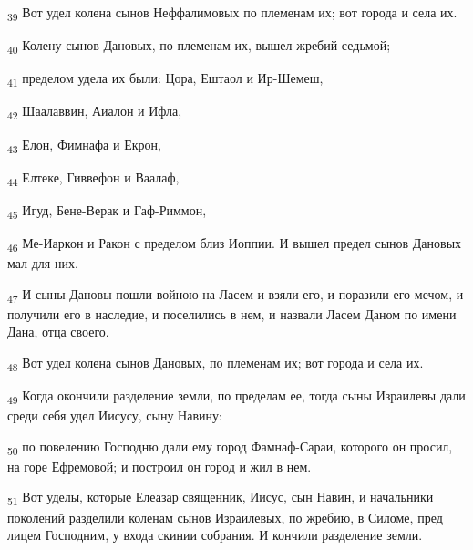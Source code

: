 \begin{tcolorbox}
\textsubscript{39} Вот удел колена сынов Неффалимовых по племенам их; вот города и села их.
\end{tcolorbox}
\begin{tcolorbox}
\textsubscript{40} Колену сынов Дановых, по племенам их, вышел жребий седьмой;
\end{tcolorbox}
\begin{tcolorbox}
\textsubscript{41} пределом удела их были: Цора, Ештаол и Ир-Шемеш,
\end{tcolorbox}
\begin{tcolorbox}
\textsubscript{42} Шаалаввин, Аиалон и Ифла,
\end{tcolorbox}
\begin{tcolorbox}
\textsubscript{43} Елон, Фимнафа и Екрон,
\end{tcolorbox}
\begin{tcolorbox}
\textsubscript{44} Елтеке, Гиввефон и Ваалаф,
\end{tcolorbox}
\begin{tcolorbox}
\textsubscript{45} Игуд, Бене-Верак и Гаф-Риммон,
\end{tcolorbox}
\begin{tcolorbox}
\textsubscript{46} Ме-Иаркон и Ракон с пределом близ Иоппии. И вышел предел сынов Дановых мал для них.
\end{tcolorbox}
\begin{tcolorbox}
\textsubscript{47} И сыны Дановы пошли войною на Ласем и взяли его, и поразили его мечом, и получили его в наследие, и поселились в нем, и назвали Ласем Даном по имени Дана, отца своего.
\end{tcolorbox}
\begin{tcolorbox}
\textsubscript{48} Вот удел колена сынов Дановых, по племенам их; вот города и села их.
\end{tcolorbox}
\begin{tcolorbox}
\textsubscript{49} Когда окончили разделение земли, по пределам ее, тогда сыны Израилевы дали среди себя удел Иисусу, сыну Навину:
\end{tcolorbox}
\begin{tcolorbox}
\textsubscript{50} по повелению Господню дали ему город Фамнаф-Сараи, которого он просил, на горе Ефремовой; и построил он город и жил в нем.
\end{tcolorbox}
\begin{tcolorbox}
\textsubscript{51} Вот уделы, которые Елеазар священник, Иисус, сын Навин, и начальники поколений разделили коленам сынов Израилевых, по жребию, в Силоме, пред лицем Господним, у входа скинии собрания. И кончили разделение земли.
\end{tcolorbox}
